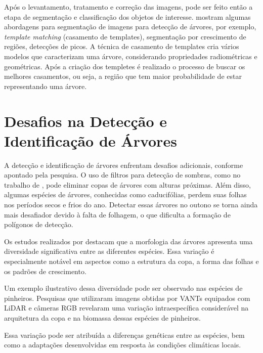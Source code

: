\documentclass[
    12pt,                   %
    openright,              %
    oneside,                %
    a4paper,                %
    sumario=tradicional,    %
    english,                %
    brazil,                 %
    ]{abntex2}
\begin{document}
   
   Após o levantamento, tratamento e correção das imagens, pode ser feito então a etapa de segmentação e classificação dos objetos de interesse. \textcite{erigo} mostram algumas abordagens para segmentação de imagens para detecção de árvores, por exemplo, \textit{template matching} (casamento de templates), segmentação por crescimento de regiões, detecções de picos. A técnica de casamento de templates cria vários modelos que caracterizam uma árvore, considerando propriedades radiométricas e geométricas. 
   Após a criação dos templetes é realizado o processo de buscar os melhores casamentos, ou seja, a região que tem maior probabilidade de estar representando uma árvore.
    
   
\section{Desafios na Detecção e Identificação de Árvores}
    A detecção e identificação de árvores enfrentam desafios adicionais, conforme apontado pela pesquisa. O uso de filtros para detecção de sombras, como no trabalho de \textcite{dos2006detecccao}, pode eliminar copas de árvores com alturas próximas. Além disso, algumas espécies de árvores, conhecidas como caducifólias, perdem suas folhas nos períodos secos e frios do ano. Detectar essas árvores no outono se torna ainda mais desafiador devido à falta de folhagem, o que dificulta a formação de polígonos de detecção.

    Os estudos realizados por \textcite{rs14225904} destacam que a morfologia das árvores apresenta uma diversidade significativa entre as diferentes espécies. Essa variação é especialmente notável em aspectos como a estrutura da copa, a forma das folhas e os padrões de crescimento.

    Um exemplo ilustrativo dessa diversidade pode ser observado nas espécies de pinheiros. Pesquisas que utilizaram imagens obtidas por VANTs equipados com LiDAR e câmeras RGB revelaram uma variação intraespecífica considerável na arquitetura da copa e na biomassa dessas espécies de pinheiros.

    Essa variação pode ser atribuída a diferenças genéticas entre as espécies, bem como a adaptações desenvolvidas em resposta às condições climáticas locais.
   
\end{document}
